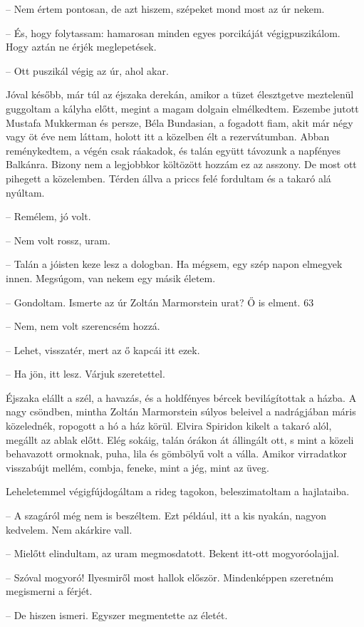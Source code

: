 \documentclass{IEEEtran}
\begin{document}
– Nem értem pontosan, de azt hiszem, szépeket mond most az úr nekem.

– És, hogy folytassam: hamarosan minden egyes porcikáját végigpuszikálom. Hogy
aztán ne érjék meglepetések.

– Ott puszikál végig az úr, ahol akar.

Jóval később, már túl az éjszaka derekán, amikor a tüzet élesztgetve
meztelenül guggoltam a kályha előtt, megint a magam dolgain elmélkedtem.
Eszembe jutott Mustafa Mukkerman és persze, Béla Bundasian, a fogadott fiam,
akit már négy vagy öt éve nem láttam, holott itt a közelben élt a
rezervátumban. Abban reménykedtem, a végén csak ráakadok, és talán együtt
távozunk a napfényes Balkánra. Bizony nem a legjobbkor költözött hozzám ez az
asszony. De most ott pihegett a közelemben. Térden állva a priccs felé
fordultam és a takaró alá nyúltam.

– Remélem, jó volt.

– Nem volt rossz, uram.

– Talán a jóisten keze lesz a dologban. Ha mégsem, egy szép napon elmegyek
innen. Megsúgom, van nekem egy másik életem.

– Gondoltam. Ismerte az úr Zoltán Marmorstein urat? Ő is elment.
63

– Nem, nem volt szerencsém hozzá.

– Lehet, visszatér, mert az ő kapcái itt ezek.

– Ha jön, itt lesz. Várjuk szeretettel.

Éjszaka elállt a szél, a havazás, és a holdfényes bércek bevilágítottak a
házba. A nagy csöndben, mintha Zoltán Marmorstein súlyos beleivel a
nadrágjában máris közelednék, ropogott a hó a ház körül. Elvira Spiridon
kikelt a takaró alól, megállt az ablak előtt. Elég sokáig, talán órákon át
állingált ott, s mint a közeli behavazott ormoknak, puha, lila és gömbölyű
volt a válla. Amikor virradatkor visszabújt mellém, combja, feneke, mint a
jég, mint az üveg.

Leheletemmel végigfújdogáltam a rideg tagokon, beleszimatoltam a hajlataiba.

– A szagáról még nem is beszéltem. Ezt például, itt a kis nyakán, nagyon
kedvelem. Nem akárkire vall.

– Mielőtt elindultam, az uram megmosdatott. Bekent itt-ott mogyoróolajjal.

– Szóval mogyoró! Ilyesmiről most hallok először. Mindenképpen szeretném
megismerni a férjét.

– De hiszen ismeri. Egyszer megmentette az életét.
\end{document}

